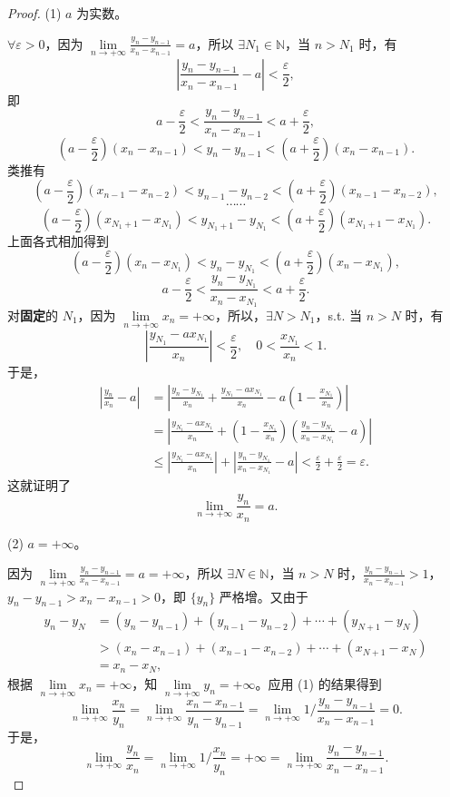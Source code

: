 \begin{proof}
(1) $a$ 为实数。

$\forall \varepsilon > 0$，因为 $\lim\limits_{n\to+\infty} \frac{y_n - y_{n-1}}{x_n - x_{n-1}} = a$，所以 $\exists N_1 \in \mathbb{N}$，当 $n > N_1$ 时，有
\[
\left|\frac{y_n - y_{n-1}}{x_n - x_{n-1}} - a\right| < \frac{\varepsilon}{2},
\]
即
\[
a - \frac{\varepsilon}{2} < \frac{y_n - y_{n-1}}{x_n - x_{n-1}} < a + \frac{\varepsilon}{2},
\]
\[
\left(a - \frac{\varepsilon}{2}\right)(x_n - x_{n-1}) < y_n - y_{n-1} < \left(a + \frac{\varepsilon}{2}\right)(x_n - x_{n-1}).
\]
类推有
\[
\left(a - \frac{\varepsilon}{2}\right)(x_{n-1} - x_{n-2}) < y_{n-1} - y_{n-2} < \left(a + \frac{\varepsilon}{2}\right)(x_{n-1} - x_{n-2}),
\]
\[
\cdots\cdots
\]
\[
\left(a - \frac{\varepsilon}{2}\right)(x_{N_1+1} - x_{N_1}) < y_{N_1+1} - y_{N_1} < \left(a + \frac{\varepsilon}{2}\right)(x_{N_1+1} - x_{N_1}).
\]
上面各式相加得到
\[
\left(a - \frac{\varepsilon}{2}\right)(x_n - x_{N_1}) < y_n - y_{N_1} < \left(a + \frac{\varepsilon}{2}\right)(x_n - x_{N_1}),
\]
\[
a - \frac{\varepsilon}{2} < \frac{y_n - y_{N_1}}{x_n - x_{N_1}} < a + \frac{\varepsilon}{2}.
\]
对\textbf{固定}的 $N_1$，因为 $\lim\limits_{n\to+\infty} x_n = +\infty$，所以，$\exists N > N_1$，s.t. 当 $n > N$ 时，有
\[
\left|\frac{y_{N_1} - a x_{N_1}}{x_n}\right| < \frac{\varepsilon}{2},\quad 0 < \frac{x_{N_1}}{x_n} < 1.
\]
于是，
\begin{align*}
\left|\frac{y_n}{x_n} - a\right| &= \left|\frac{y_n - y_{N_1}}{x_n} + \frac{y_{N_1} - a x_{N_1}}{x_n} - a\left(1 - \frac{x_{N_1}}{x_n}\right)\right|\\
&= \left|\frac{y_{N_1} - a x_{N_1}}{x_n} + \left(1 - \frac{x_{N_1}}{x_n}\right)\left(\frac{y_n - y_{N_1}}{x_n - x_{N_1}} - a\right)\right|\\
&\leqslant \left|\frac{y_{N_1} - a x_{N_1}}{x_n}\right| + \left|\frac{y_n - y_{N_1}}{x_n - x_{N_1}} - a\right| < \frac{\varepsilon}{2} + \frac{\varepsilon}{2} = \varepsilon.
\end{align*}
这就证明了
\[
\lim_{n\to+\infty} \frac{y_n}{x_n} = a.
\]

(2) $a = +\infty$。

因为 $\lim\limits_{n\to+\infty} \frac{y_n - y_{n-1}}{x_n - x_{n-1}} = a = +\infty$，所以 $\exists N \in \mathbb{N}$，当 $n > N$ 时，$\frac{y_n - y_{n-1}}{x_n - x_{n-1}} > 1$，$y_n - y_{n-1} > x_n - x_{n-1} > 0$，即 $\{y_n\}$ 严格增。又由于
\begin{align*}
y_n - y_N &= (y_n - y_{n-1}) + (y_{n-1} - y_{n-2}) + \cdots + (y_{N+1} - y_N)\\
&> (x_n - x_{n-1}) + (x_{n-1} - x_{n-2}) + \cdots + (x_{N+1} - x_N)\\
&= x_n - x_N,
\end{align*}
根据 $\lim\limits_{n\to+\infty} x_n = +\infty$，知 $\lim\limits_{n\to+\infty} y_n = +\infty$。应用 (1) 的结果得到
\[
\lim_{n\to+\infty} \frac{x_n}{y_n} = \lim_{n\to+\infty} \frac{x_n - x_{n-1}}{y_n - y_{n-1}} = \lim_{n\to+\infty} 1 \bigg/ \frac{y_n - y_{n-1}}{x_n - x_{n-1}} = 0.
\]
于是，
\[
\lim_{n\to+\infty} \frac{y_n}{x_n} = \lim_{n\to+\infty} 1 \bigg/ \frac{x_n}{y_n} = +\infty = \lim_{n\to+\infty} \frac{y_n - y_{n-1}}{x_n - x_{n-1}}.
\]


\end{proof}
